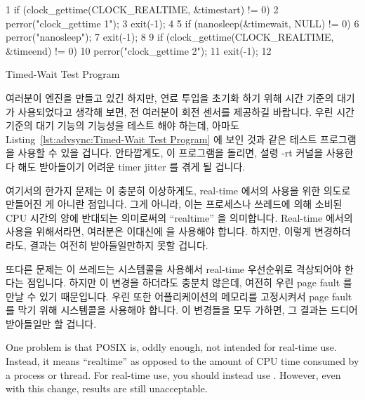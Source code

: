 \begin{listing}[tb]
{ \scriptsize
\begin{verbbox}
 1 if (clock_gettime(CLOCK_REALTIME, &timestart) != 0) {
 2   perror("clock_gettime 1");
 3   exit(-1);
 4 }
 5 if (nanosleep(&timewait, NULL) != 0) {
 6   perror("nanosleep");
 7   exit(-1);
 8 }
 9 if (clock_gettime(CLOCK_REALTIME, &timeend) != 0) {
10   perror("clock_gettime 2");
11   exit(-1);
12 }
\end{verbbox}
}
\centering
\theverbbox
\caption{Timed-Wait Test Program}
\label{lst:advsync:Timed-Wait Test Program}
\end{listing}

여러분이 엔진을 만들고 있긴 하지만, 연료 투입을 초기화 하기 위해 시간 기준의
대기가 사용되었다고 생각해 보면, 전 여러분이 회전 센서를 제공하길 바랍니다.
우린 시간 기준의 대기 기능의 기능성을 테스트 해야 하는데, 아마도
Listing~\ref{lst:advsync:Timed-Wait Test Program} 에 보인 것과 같은 테스트
프로그램을 사용할 수 있을 겁니다.
안타깝게도, 이 프로그램을 돌리면, 설령 -rt 커널을 사용한다 해도 받아들이기
어려운 timer jitter 를 겪게 될 겁니다.

여기서의 한가지 문제는  이 충분히 이상하게도, real-time
에서의 사용을 위한 의도로 만들어진 게 아니란 점입니다.
그게 아니라, 이는 프로세스나 쓰레드에 의해 소비된 CPU 시간의 양에 반대되는
의미로써의 ``realtime'' 을 의미합니다.
Real-time 에서의 사용을 위해서라면, 여러분은 이대신에  을
사용해야 합니다.
하지만, 이렇게 변경하더라도, 결과는 여전히 받아들일만하지 못할 겁니다.

또다른 문제는 이 쓰레드는  시스템콜을 사용해서
real-time 우선순위로 격상되어야 한다는 점입니다.
하지만 이 변경을 하더라도 충분치 않은데, 여전히 우린 page fault 를 만날 수 있기
때문입니다.
우린 또한 어플리케이션의 메모리를 고정시켜서 page fault 를 막기 위해
 시스템콜을 사용해야 합니다.
이 변경들을 모두 가하면, 그 결과는 드디어 받아들일만 할 겁니다.
\iffalse

One problem is that POSIX  is, oddly enough, not intended
for real-time use.
Instead, it means ``realtime'' as opposed to the amount of CPU time
consumed by a process or thread.
For real-time use, you should instead use .
However, even with this change, results are still unacceptable.

